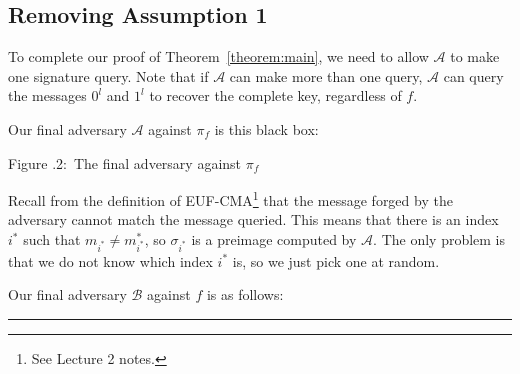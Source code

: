 \documentclass[twoside]{article}
\newcounter{lecnum}
\newcommand{\fig}[3]{
            \vspace{#2}
            \begin{center}
            Figure \thelecnum.#1:~#3
            \end{center}
    }
\newenvironment{proof}{{\bf Proof:}}{\hfill\rule{2mm}{2mm}}
\begin{document}
\subsection{Removing Assumption 1}

To complete our proof of Theorem~\ref{theorem:main}, we need to allow $\mathcal{A}$ to make one signature query. Note that if $\mathcal{A}$ can make more than one query, $\mathcal{A}$ can query the messages $0^l$ and $1^l$ to recover the complete key, regardless of $f$.

\begin{proof}
Our final adversary $\mathcal{A}$ against $\pi_f$ is this black box:

\begin{center}
\end{center}
\fig{2}{0in}{The final adversary against $\pi_f$}

Recall from the definition of EUF-CMA\footnote{See Lecture 2 notes.} that the message forged by the adversary cannot match the message queried. This means that there is an index $i^*$ such that $m_{i^*} \neq m^*_{i^*}$, so $\sigma_{i^*}$ is a preimage computed by $\mathcal{A}$. The only problem is that we do not know which index $i^*$ is, so we just pick one at random.

Our final adversary $\mathcal{B}$ against $f$ is as follows:


\end{proof}
\end{document}
